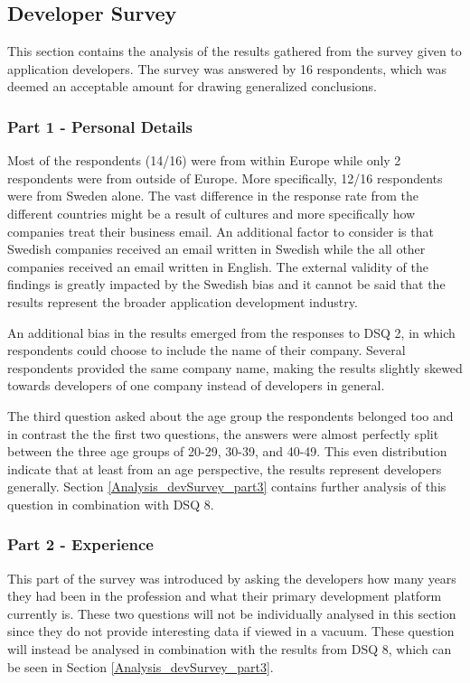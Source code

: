 \documentclass[a4paper,12pt]{article}
\begin{document}
\subsection{Developer Survey}
\label{Analysis_devSurvey}
This section contains the analysis of the results gathered from the survey given to application developers. The survey was answered by 16 respondents, which was deemed an acceptable amount for drawing generalized conclusions.

\subsubsection{Part 1 - Personal Details}
\label{Analysis_devSurvey_part1}
Most of the respondents (14/16) were from within Europe while only 2 respondents were from outside of Europe. More specifically, 12/16 respondents were from Sweden alone. The vast difference in the response rate from the different countries might be a result of cultures and more specifically how companies treat their business email. An additional factor to consider is that Swedish companies received an email written in Swedish while the all other companies received an email written in English. The external validity of the findings is greatly impacted by the Swedish bias and it cannot be said that the results represent the broader application development industry.

An additional bias in the results emerged from the responses to DSQ 2, in which respondents could choose to include the name of their company. Several respondents provided the same company name, making the results slightly skewed towards developers of one company instead of developers in general.

The third question asked about the age group the respondents belonged too and in contrast the the first two questions, the answers were almost perfectly split between the three age groups of 20-29, 30-39, and 40-49. This even distribution indicate that at least from an age perspective, the results represent developers generally. Section \ref{Analysis_devSurvey_part3} contains further analysis of this question in combination with DSQ 8.

\subsubsection{Part 2 - Experience}
\label{Analysis_devSurvey_part2}
This part of the survey was introduced by asking the developers how many years they had been in the profession and what their primary development platform currently is. These two questions will not be individually analysed in this section since they do not provide interesting data if viewed in a vacuum. These question will instead be analysed in combination with the results from DSQ 8, which can be seen in Section \ref{Analysis_devSurvey_part3}.
\end{document}
